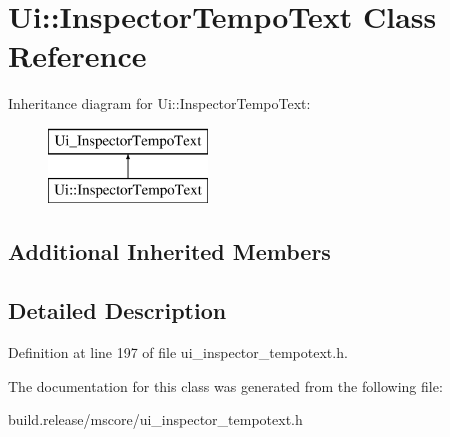 \hypertarget{class_ui_1_1_inspector_tempo_text}{}\section{Ui\+:\+:Inspector\+Tempo\+Text Class Reference}
\label{class_ui_1_1_inspector_tempo_text}
Inheritance diagram for Ui\+:\+:Inspector\+Tempo\+Text\+:\begin{figure}[H]
\begin{center}
\leavevmode
\includegraphics[height=2.000000cm]{class_ui_1_1_inspector_tempo_text}
\end{center}
\end{figure}
\subsection*{Additional Inherited Members}


\subsection{Detailed Description}


Definition at line 197 of file ui\+\_\+inspector\+\_\+tempotext.\+h.



The documentation for this class was generated from the following file\+:\begin{DoxyCompactItemize}
\item 
build.\+release/mscore/ui\+\_\+inspector\+\_\+tempotext.\+h\end{DoxyCompactItemize}
